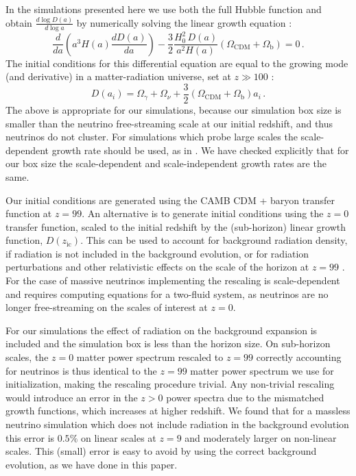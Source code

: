 \documentclass[useAMS, usenatbib]{mnras}
\begin{document}
In the simulations presented here we use both the full Hubble function
and obtain $\frac{d \log D(a)}{d \log a}$ by numerically solving
the linear growth equation \citep{Peebles:1993}:
\begin{equation}
\frac{d}{da}\left(a^3 H(a) \frac{d D(a)}{da}\right) - \frac{3}{2} \frac{H_0^2\,D(a)}{a^2 H(a)} \left(\Omega_\mathrm{CDM} + \Omega_\mathrm{b}\right)= 0\,.
\label{eq:lineargrowth}
\end{equation}
The initial conditions for this differential equation are equal to the growing mode (and derivative) in a matter-radiation universe, set at $z \gg 100$ \citep{Groth:1975}:
\begin{equation}
  D(a_i) = \Omega_\gamma + \Omega_\nu + \frac{3}{2} \left(\Omega_\mathrm{CDM} + \Omega_\mathrm{b}\right) a_i\,.
\end{equation}
The above is appropriate for our simulations, because our simulation box size is smaller than the neutrino free-streaming scale at our initial redshift, and thus neutrinos do not cluster. For simulations which probe large scales the scale-dependent growth rate should be used, as in \cite{OLeary_2012, Zennaro_2017}. We have checked explicitly that for our box size the scale-dependent and scale-independent growth rates are the same.

Our initial conditions are generated using the CAMB CDM + baryon transfer function at $z=99$. An alternative is to generate initial conditions using the $z=0$ transfer function, scaled to the initial redshift by the (sub-horizon) linear growth function, $D(z_\mathrm{ic})$. This can be used to account for background radiation density, if radiation is not included in the background evolution, or for radiation perturbations and other relativistic effects on the scale of the horizon at $z=99$ \citep{Zennaro_2017}. For the case of massive neutrinos implementing the rescaling is scale-dependent and requires computing equations for a two-fluid system, as neutrinos are no longer free-streaming on the scales of interest at $z=0$.

For our simulations the effect of radiation on the background expansion is included and the simulation box is less than the horizon size. On sub-horizon scales, the $z=0$ matter power spectrum rescaled to $z=99$ correctly accounting for neutrinos is thus identical to the $z=99$ matter power spectrum we use for initialization, making the rescaling procedure trivial. Any non-trivial rescaling would introduce an error in the $z > 0$ power spectra due to the mismatched growth functions, which increases at higher redshift. We found that for a massless neutrino simulation which does not include radiation in the background evolution this error is $0.5\%$ on linear scales at $z=9$ and moderately larger on non-linear scales. This (small) error is easy to avoid by using the correct background evolution, as we have done in this paper.

\label{lastpage}


\end{document}
